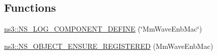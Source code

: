 \subsection*{Functions}
\begin{DoxyCompactItemize}
\item 
\hyperlink{namespacens3_a6fcb6718c220a832ec7fda167f613780}{ns3\+::\+N\+S\+\_\+\+L\+O\+G\+\_\+\+C\+O\+M\+P\+O\+N\+E\+N\+T\+\_\+\+D\+E\+F\+I\+NE} (\char`\"{}Mm\+Wave\+Enb\+Mac\char`\"{})
\item 
\hyperlink{namespacens3_aa069a19dce2d28b1c7d5dca9a9a9962f}{ns3\+::\+N\+S\+\_\+\+O\+B\+J\+E\+C\+T\+\_\+\+E\+N\+S\+U\+R\+E\+\_\+\+R\+E\+G\+I\+S\+T\+E\+R\+ED} (Mm\+Wave\+Enb\+Mac)
\end{DoxyCompactItemize}
